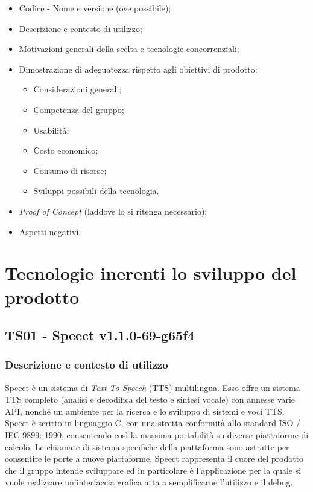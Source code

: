 \documentclass[./../Technology Baseline.tex]{subfiles}
\begin{document}
\begin{itemize}
	\item Codice - Nome e versione (ove possibile);
	\item Descrizione e contesto di utilizzo;
	\item Motivazioni generali della scelta e tecnologie concorrenziali;
	\item Dimostrazione di adeguatezza rispetto agli obiettivi di prodotto:
	\begin{itemize}
		\item Considerazioni generali;
		\item Competenza del gruppo;
		\item Usabilità;
		\item Costo economico;
		\item Consumo di risorse;
		\item Sviluppi possibili della tecnologia.
	\end{itemize}
	\item \textit{Proof of Concept} (laddove lo si ritenga necessario);
	\item Aspetti negativi.
\end{itemize}

\section{Tecnologie inerenti lo sviluppo del prodotto}

\subsection{TS01 - Speect v1.1.0-69-g65f4}

\subsubsection{Descrizione e contesto di utilizzo}

Speect è un sistema di \textit{Text To Speech} (TTS) multilingua. Esso offre un sistema TTS completo (analisi e decodifica del testo e sintesi vocale) con annesse varie API, nonché un ambiente per la ricerca e lo sviluppo di sistemi e voci TTS. Speect è scritto in linguaggio C, con una stretta conformità allo standard ISO / IEC 9899: 1990, consentendo così la massima portabilità su diverse piattaforme di calcolo. Le chiamate di sistema specifiche della piattaforma sono astratte per consentire le porte a nuove piattaforme. Speect rappresenta il cuore del prodotto che il gruppo intende sviluppare ed in particolare è l'applicazione per la quale si vuole realizzare un'interfaccia grafica atta a semplificarne l'utilizzo e il debug.
\end{document}
